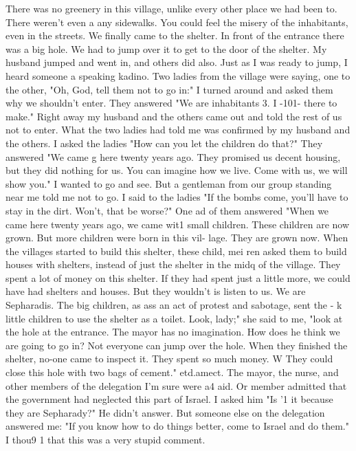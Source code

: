 {{There was 
no greenery in this village, unlike every other place we had been to.
There weren't even a 
any sidewalks.
You could feel the misery of the inhabitants, even in the streets.
We finally came to the shelter.
In front of the entrance there was a big hole.
We 
had to jump over it to get to the door of the shelter.
My husband jumped and went in, and 
others did also.
Just as I was ready to jump, I heard someone a speaking kadino.
Two 
ladies from the village were saying, one to the other, "Oh, God, tell them not to go in:" 
I turned around and asked them why we shouldn't enter.
They answered "We are inhabitants 
3.
I 
-101- 
there to make."
Right away my husband and the others came out and told the rest of us not 
to enter.
What the two ladies had told me was confirmed by my husband and the others.
I 
asked the ladies "How can you let the children do that?"
They answered "We came g here 
twenty years ago.
They promised us decent housing, but they did nothing for us.
You can 
imagine how we live.
Come with us, we will show you."
I wanted to go and see.
But a gentleman from our group standing near me told me not 
to go.
I said to the ladies "If the bombs come, you'll have to stay in the dirt.
Won't, 
that be worse?"
One ad of them answered "When we came here twenty years ago, we came wit1 
small children.
These children are now grown.
But more children were born in this vil-
lage.
They are grown now.
When the villages started to build this shelter, these child, 
mei ren asked them to build houses with shelters, instead of just the shelter in the midq 
of the village.
They spent a lot of money on this shelter.
If they had spent just a 
little more, we could have had shelters and houses.
But they wouldn't is listen to us.
We are Sepharadis.
The big children, as ass an act of protest and sabotage, sent the - 
k little children to use the shelter as a toilet.
Look, lady;" she said to me, "look at 
the hole at the entrance.
The mayor has no imagination.
How does he think we are going 
to go in?
Not everyone can jump over the hole.
When they finished the shelter, no-one 
came to inspect it.
They spent so much money.
W They could close this hole with two 
bags of cement."
etd.amect.
The mayor, the nurse, and other members of the delegation I'm sure were a4 aid.
Or 
member admitted that the government had neglected this part of Israel.
I asked him "Is '1 
it because they are Sepharady?"
He didn't answer.
But someone else on the delegation 
answered me: "If you know how to do things better, come to Israel and do them."
I thou9 1 
that this was a very stupid comment.
}}

